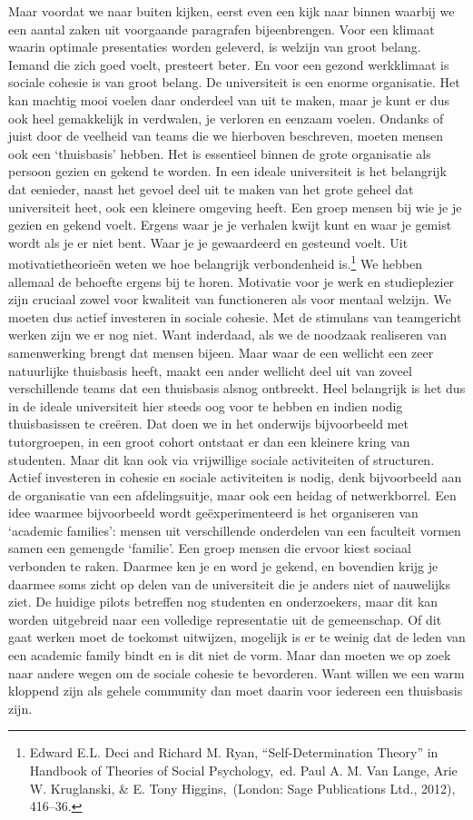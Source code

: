 \documentclass[empirical, authordate, ]{new-jote-article}
\begin{document}
	Maar voordat we naar buiten kijken, eerst even een kijk naar binnen waarbij we een aantal zaken uit voorgaande paragrafen bijeenbrengen. Voor een klimaat waarin optimale presentaties worden geleverd, is welzijn van groot belang. Iemand die zich goed voelt, presteert beter. En voor een gezond werkklimaat is sociale cohesie is van groot belang. De universiteit is een enorme organisatie. Het kan machtig mooi voelen daar onderdeel van uit te maken, maar je kunt er dus ook heel gemakkelijk in verdwalen, je verloren en eenzaam voelen. Ondanks of juist door de veelheid van teams die we hierboven beschreven, moeten mensen ook een ‘thuisbasis' hebben. Het is essentieel binnen de grote organisatie als persoon gezien en gekend te worden. In een ideale universiteit is het belangrijk dat eenieder, naast het gevoel deel uit te maken van het grote geheel dat universiteit heet, ook een kleinere omgeving heeft. Een groep mensen bij wie je je gezien en gekend voelt. Ergens waar je je verhalen kwijt kunt en waar je gemist wordt als je er niet bent. Waar je je gewaardeerd en gesteund voelt. Uit motivatietheorieën weten we hoe belangrijk verbondenheid is.\footnote{Edward E.L. Deci and Richard M. Ryan, “Self-Determination Theory” in Handbook of Theories of Social Psychology, ed. Paul A. M. Van Lange, Arie W. Kruglanski, \& E. Tony Higgins, (London: Sage Publications Ltd., 2012), 416--36. } We hebben allemaal de behoefte ergens bij te horen. Motivatie voor je werk en studieplezier zijn cruciaal zowel voor kwaliteit van functioneren als voor mentaal welzijn. We moeten dus actief investeren in sociale cohesie. Met de stimulans van teamgericht werken zijn we er nog niet. Want inderdaad, als we de noodzaak realiseren van samenwerking brengt dat mensen bijeen. Maar waar de een wellicht een zeer natuurlijke thuisbasis heeft, maakt een ander wellicht deel uit van zoveel verschillende teams dat een thuisbasis alsnog ontbreekt. Heel belangrijk is het dus in de ideale universiteit hier steeds oog voor te hebben en indien nodig thuisbasissen te creëren. Dat doen we in het onderwijs bijvoorbeeld met tutorgroepen, in een groot cohort ontstaat er dan een kleinere kring van studenten. Maar dit kan ook via vrijwillige sociale activiteiten of structuren. Actief investeren in cohesie en sociale activiteiten is nodig, denk bijvoorbeeld aan de organisatie van een afdelingsuitje, maar ook een heidag of netwerkborrel. Een idee waarmee bijvoorbeeld wordt geëxperimenteerd is het organiseren van ‘academic families': mensen uit verschillende onderdelen van een faculteit vormen samen een gemengde ‘familie'. Een groep mensen die ervoor kiest sociaal verbonden te raken. Daarmee ken je en word je gekend, en bovendien krijg je daarmee soms zicht op delen van de universiteit die je anders niet of nauwelijks ziet. De huidige pilots betreffen nog studenten en onderzoekers, maar dit kan worden uitgebreid naar een volledige representatie uit de gemeenschap. Of dit gaat werken moet de toekomst uitwijzen, mogelijk is er te weinig dat de leden van een academic family bindt en is dit niet de vorm. Maar dan moeten we op zoek naar andere wegen om de sociale cohesie te bevorderen. Want willen we een warm kloppend zijn als gehele community dan moet daarin voor iedereen een thuisbasis zijn.
\end{document}
